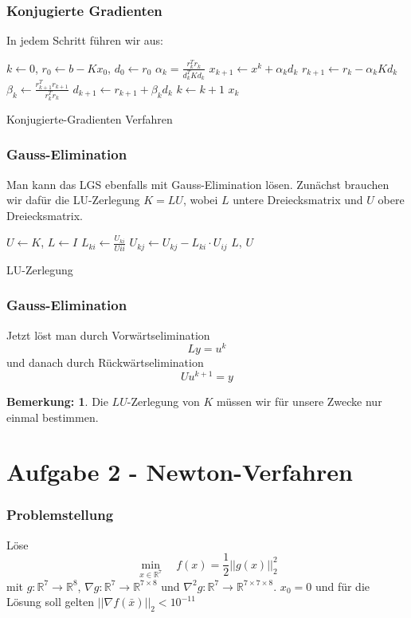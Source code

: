 \documentclass[xcolor = dvipsnames, notheorems, 10pt]{beamer}
\newcommand{\vth}{\vspace{4pt}}
\theoremstyle{definition}
\newtheorem{remark}		{Bemerkung:\vth}
\begin{document}
\begin{frame}
\frametitle{Konjugierte Gradienten}
	In jedem Schritt führen wir aus:
	\begin{algorithm}[H]
		\begin{algorithmic}[1]
			\STATE $k \gets 0$, $r_0 \gets b-Kx_0$, $d_0 \gets r_0$
				\STATE $\alpha_k = \frac{r_k^T r_k}{d_k^T K d_k}$
				\STATE $x_{k+1} \gets x^k + \alpha_k d_k$
				\STATE $r_{k+1} \gets r_k - \alpha_k K d_k$
				\STATE $\beta_k \gets \frac{r_{k+1}^T r_{k+1}}{r_k^T r_k}$
				\STATE $d_{k+1} \gets r_{k+1} + \beta_k d_k$
				\STATE $k \gets k+1$
			\ENDWHILE
			\RETURN $x_k$
		\end{algorithmic}
		\caption{Konjugierte-Gradienten Verfahren}
	\end{algorithm}
\end{frame}

\begin{frame}
\frametitle{Gauss-Elimination}
	Man kann das LGS ebenfalls mit Gauss-Elimination lösen. Zunächst brauchen wir dafür die LU-Zerlegung $K = LU$, wobei $L$ untere Dreiecksmatrix und $U$ obere Dreiecksmatrix.
	\begin{algorithm}[H]
		\begin{algorithmic}[1]
			\STATE $U \gets K$, $L \gets I$
					\STATE $L_{ki} \gets \frac{U_{ki}}{U{ii}}$
						\STATE $U_{kj} \gets U_{kj} - L_{ki} \cdot U_{ij}$
					\ENDFOR
				\ENDFOR
			\ENDFOR
			\RETURN $L$, $U$
		\end{algorithmic}
		\caption{LU-Zerlegung}
	\end{algorithm}
\end{frame}

\begin{frame}
\frametitle{Gauss-Elimination}
	Jetzt löst man durch Vorwärtselimination
	$$Ly = u^{k}$$
	und danach durch Rückwärtselimination
	$$Uu^{k+1} = y$$
	\begin{remark}
		Die $LU$-Zerlegung von $K$ müssen wir für unsere Zwecke nur einmal bestimmen. 
	\end{remark}

\end{frame}

\section{Aufgabe 2 - Newton-Verfahren}
\begin{frame}
\frametitle{Problemstellung}
	Löse
		$$\min_{x \in \mathbb{R}^7} \quad f(x) = \frac{1}{2}||g(x)||_2^2$$
	mit $g: \mathbb{R}^7 \rightarrow \mathbb{R}^8$, $\nabla g: \mathbb{R}^7 \rightarrow \mathbb{R}^{7 \times 8}$ und $\nabla^2 g: \mathbb{R}^7 \rightarrow \mathbb{R}^{7 \times 7 \times 8}$. $x_0 = 0$ und für die Lösung soll gelten $||\nabla f(\bar x)||_2 < 10^{-11}$
	\vfill
\end{frame}
\end{document}
